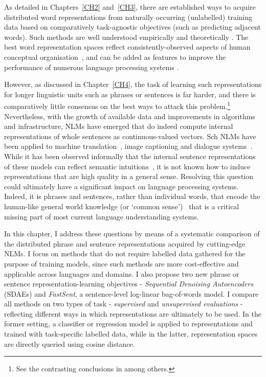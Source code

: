 \label{CH5}

As detailed in Chapters~\ref{CH2} and~\ref{CH3}, there are established ways to acquire distributed word representations from naturally occurring (unlabelled) training data based on comparatively task-agnostic objectives (such as predicting adjacent words). Such methods are well understood empirically \citep{baroni2014don} and theoretically \citep{levy2014neural}. The best word representation spaces reflect consistently-observed aspects of human conceptual organisation~\citep{hill2014simlex}, and can be added as features to improve the performance of numerous language processing systems \citep{collobert2011natural}. 

However, as discussed in Chapter~\ref{CH4}, the task of learning such representations for longer linguistic units such as phrases or sentences is far harder, and there is comparatively little consensus on the best ways to attack this problem.\footnote{See the contrasting conclusions in \citep{mitchell2008vector,clark2007combining,baroni2014frege,milajevs2014evaluating} among others.} Nevertheless, with the growth of available data and improvements in algorithms and infrastructure, NLMs have emerged that do indeed compute internal representations of whole sentences as continuous-valued vectors. Sch NLMs have been applied to machine translation~\citep{Sutskever2014sequence}, image captioning \citep{mao2014deep} and dialogue systems~\citep{serban2015building}. While it has been observed informally that the internal sentence representations of these models can reflect semantic intuitions~\citep{cho2014learning}, it is not known how to induce representations  that are high quality in a general sense. Resolving this question could ultimately have a significant impact on language processing systems. Indeed, it is phrases and sentences, rather than individual words, that encode the human-like general world knowledge (or `common sense')~\citep{norman1972memory} that is a critical missing part of most current language understanding systems.

In this chapter, I address these questions by means of a systematic comparison of the distributed phrase and sentence representations acquired by cutting-edge NLMs. I focus on methods that do not require labelled data gathered for the purpose of training models, since such methods are more cost-effective and applicable across languages and domains. I also propose two new phrase or sentence representation-learning objectives - \emph{Sequential Denoising Autoencoders} (SDAEs) and \emph{FastSent}, a sentence-level log-linear bag-of-words model. I compare all methods on two types of task - \emph{supervised} and \emph{unsupervised evaluations} - reflecting different ways in which representations are ultimately to be used. In the former setting, a classifier or regression model is applied to representations and trained with task-specific labelled data, while in the latter, representation spaces are directly queried using cosine distance.    

